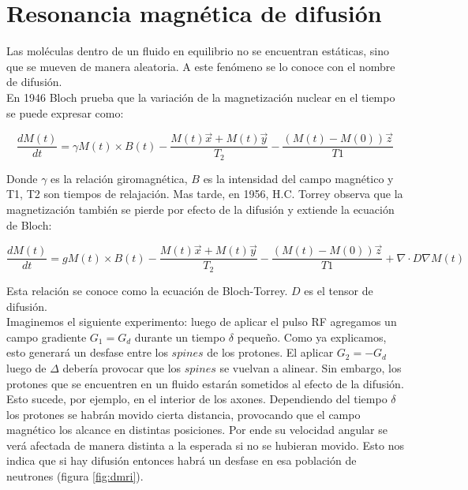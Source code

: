 \section{Resonancia magn\'etica de difusi\'on}

Las mol\'eculas dentro de un fluido en equilibrio no se encuentran 
est\'aticas, sino que se mueven de manera aleatoria. A este fen\'omeno se
lo conoce con el nombre de difusi\'on. \\

En 1946 Bloch \cite{Bloch1946} prueba que la variaci\'on de la 
magnetizaci\'on nuclear en el tiempo se puede expresar como:

$$ \frac{dM(t)}{dt} = \gamma M(t) \times B(t) 
                      - \frac{M(t) \vec{x} + M(t)\vec{y}}{T_2}
                      - \frac{(M(t)-M(0))\vec{z}}{T1} $$

Donde $\gamma$ es la relaci\'on giromagn\'etica, $B$ es la intensidad del
campo magn\'etico y T1, T2 son tiempos de relajaci\'on. Mas tarde, en
1956, H.C. Torrey \cite{Torrey1956} observa que la magnetizaci\'on 
tambi\'en se pierde por efecto de la difusi\'on y extiende la ecuaci\'on
de Bloch:

$$ \frac{dM(t)}{dt} = g M(t) \times B(t) 
                      - \frac{M(t) \vec{x} + M(t)\vec{y}}{T_2}
                      - \frac{(M(t)-M(0))\vec{z}}{T1} 
                      + \nabla \cdot D \nabla M(t) $$

Esta relaci\'on se conoce como la ecuaci\'on de Bloch-Torrey. $D$ es el tensor de difusi\'on. \\

Imaginemos el siguiente experimento: luego de aplicar el pulso RF 
agregamos un campo gradiente $G_1=G_d$ durante un tiempo $\delta$ 
peque\~no. Como ya explicamos, esto generar\'a un desfase entre los $spines$
de los protones. El aplicar $G_2=-G_d$ luego de $\Delta$ deber\'ia
provocar que los $spines$ se vuelvan a alinear. Sin embargo, los protones
que se encuentren en un fluido estar\'an sometidos al efecto de la 
difusi\'on. Esto sucede, por ejemplo, en el interior de los axones.
Dependiendo del tiempo $\delta$ los protones se habr\'an movido cierta
distancia, provocando que el campo magn\'etico los alcance en distintas 
posiciones. Por ende su velocidad angular se ver\'a afectada de manera 
distinta a la esperada si no se hubieran movido. Esto nos indica que si
hay difusi\'on entonces habr\'a un desfase en esa poblaci\'on de neutrones
(figura \ref{fig:dmri}).\\

